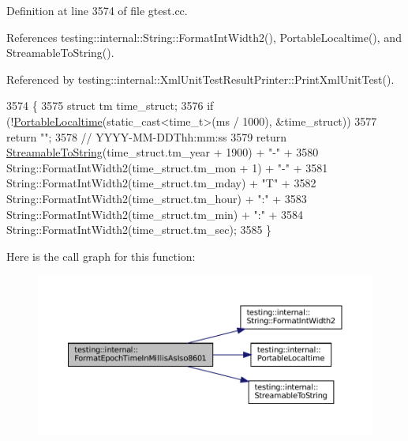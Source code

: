 Definition at line 3574 of file gtest.\+cc.



References testing\+::internal\+::\+String\+::\+Format\+Int\+Width2(), Portable\+Localtime(), and Streamable\+To\+String().



Referenced by testing\+::internal\+::\+Xml\+Unit\+Test\+Result\+Printer\+::\+Print\+Xml\+Unit\+Test().


\begin{DoxyCode}
3574                                                             \{
3575   \textcolor{keyword}{struct }tm time\_struct;
3576   \textcolor{keywordflow}{if} (!\hyperlink{namespacetesting_1_1internal_a60af94307ed4f00a57b5c6d9617c046d}{PortableLocaltime}(static\_cast<time\_t>(ms / 1000), &time\_struct))
3577     \textcolor{keywordflow}{return} \textcolor{stringliteral}{""};
3578   \textcolor{comment}{// YYYY-MM-DDThh:mm:ss}
3579   \textcolor{keywordflow}{return} \hyperlink{namespacetesting_1_1internal_aad4beed95d0846e6ffc5da0978ef3bb9}{StreamableToString}(time\_struct.tm\_year + 1900) + \textcolor{stringliteral}{"-"} +
3580       String::FormatIntWidth2(time\_struct.tm\_mon + 1) + \textcolor{stringliteral}{"-"} +
3581       String::FormatIntWidth2(time\_struct.tm\_mday) + \textcolor{stringliteral}{"T"} +
3582       String::FormatIntWidth2(time\_struct.tm\_hour) + \textcolor{stringliteral}{":"} +
3583       String::FormatIntWidth2(time\_struct.tm\_min) + \textcolor{stringliteral}{":"} +
3584       String::FormatIntWidth2(time\_struct.tm\_sec);
3585 \}
\end{DoxyCode}
Here is the call graph for this function\+:
\nopagebreak
\begin{figure}[H]
\begin{center}
\leavevmode
\includegraphics[width=350pt]{namespacetesting_1_1internal_a5ef227c4a610e7ff638b12dfb25b068e_cgraph}
\end{center}
\end{figure}
